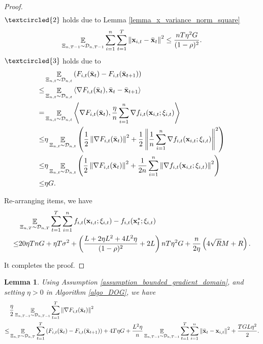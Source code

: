 \documentclass{article}
\newtheorem{Lemma}{\bf{Lemma}}
\begin{document}
\begin{proof}
\begin{align}
\end{align} $\textcircled{2}$ holds due to Lemma \ref{lemma_x_variance_norm_square}
\begin{align}
\nonumber
\mathop{\mathbb{E}}_{ \Xi_{n,T-1} \sim \mathcal{D}_{n,T-1} } \sum_{i=1}^n\sum_{t=1}^T \left\lVert{\bf x}_{i,t} - \bar{{\bf x}}_t\right\rVert^2 \le \frac{nT\eta^2 G }{(1-\rho)^2}.
\end{align} $\textcircled{3}$ holds due to 
\begin{align}
\nonumber
& \mathop{\mathbb{E}}_{ \Xi_{n,t} \sim \mathcal{D}_{n,t} } \left( F_{i,t}(\bar{{\bf x}}_t) - F_{i,t}(\bar{{\bf x}}_{t+1})  \right) \\ \nonumber 
\le & \mathop{\mathbb{E}}_{ \Xi_{n,t} \sim \mathcal{D}_{n,t} } \left\langle\nabla F_{i,t}(\bar{{\bf x}}_t), \bar{{\bf x}}_t - \bar{{\bf x}}_{t+1} \right\rangle \\ \nonumber
= & \mathop{\mathbb{E}}_{ \Xi_{n,t} \sim \mathcal{D}_{n,t} } \left\langle\nabla F_{i,t}(\bar{{\bf x}}_t), \frac{\eta}{n}\sum_{i=1}^n\nabla f_{i,t}({\bf x}_{i,t};\xi_{i,t})  \right\rangle \\ \nonumber
\le & \eta\mathop{\mathbb{E}}_{ \Xi_{n,t} \sim \mathcal{D}_{n,t} }\left(  \frac{1}{2}\left\lVert\nabla F_{i,t}(\bar{{\bf x}}_t)\right\rVert^2 + \frac{1}{2} \left\lVert\frac{1}{n}\sum_{i=1}^n\nabla f_{i,t}({\bf x}_{i,t};\xi_{i,t})\right\rVert^2  \right)\\ \nonumber
\le & \eta\mathop{\mathbb{E}}_{ \Xi_{n,t} \sim \mathcal{D}_{n,t} }\left(  \frac{1}{2}\left\lVert\nabla F_{i,t}(\bar{{\bf x}}_t)\right\rVert^2 + \frac{1}{2n}\sum_{i=1}^n\left\lVert\nabla f_{i,t}({\bf x}_{i,t};\xi_{i,t})\right\rVert^2  \right)\\ \nonumber
\le & \eta G. 
\end{align}

Re-arranging items, we have
\begin{align}
\nonumber
& \mathop{\mathbb{E}}_{ \Xi_{n,T} \sim \mathcal{D}_{n,T} } \sum_{t=1}^T\sum_{i=1}^n f_{i,t}({\bf x}_{i,t};\xi_{i,t}) - f_{i,t}({\bf x}_t^\ast;\xi_{i,t}) \\ \nonumber
\le & 20\eta T n G +  \eta T\sigma^2 + \left( \frac{L + 2\eta L^2  + 4L^2 \eta}{(1-\rho)^2} +2L \right)  nT\eta^2 G    + \frac{n}{2\eta}\left(  4\sqrt{R}M + R   \right).
\end{align}

It completes the proof.



\end{proof}




\begin{Lemma}
\label{lemma_gradient_norm_bound}
Using Assumption \ref{assumption_bounded_gradient_domain}, and setting $\eta>0$ in Algorithm \ref{algo_DOG}, we have 
\begin{align}
& \frac{\eta}{2} \mathop{\mathbb{E}}_{ \Xi_{n,T-1} \sim \mathcal{D}_{n,T-1} }\sum_{t=1}^T \left\lVert\nabla F_{i,t}(\bar{{\bf x}}_t)\right\rVert^2 \\ \nonumber
\le & \mathop{\mathbb{E}}_{ \Xi_{n,T} \sim \mathcal{D}_{n,T} } \sum_{t=1}^T  \left( F_{i,t}(\bar{{\bf x}}_t) - F_{i,t}(\bar{{\bf x}}_{t+1}) \right) + 4T  \eta G + \frac{ L^2 \eta}{n}\mathop{\mathbb{E}}_{ \Xi_{n,T-1} \sim \mathcal{D}_{n,T-1} }\sum_{t=1}^T\sum_{i=1}^n \left\lVert \bar{{\bf x}}_t - {\bf x}_{i,t} \right\rVert^2 + \frac{TGL\eta^2}{2}.
\end{align}
\end{Lemma}
\end{document}
